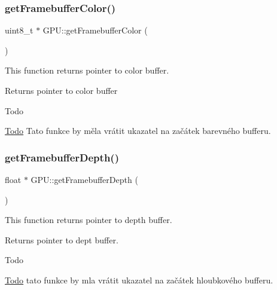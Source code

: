 \subsubsection{\texorpdfstring{get\+Framebuffer\+Color()}{getFramebufferColor()}}
{\footnotesize\ttfamily uint8\+\_\+t $\ast$ G\+P\+U\+::get\+Framebuffer\+Color (\begin{DoxyParamCaption}{ }\end{DoxyParamCaption})}



This function returns pointer to color buffer. 

\begin{DoxyReturn}{Returns}
pointer to color buffer 
\end{DoxyReturn}
\begin{DoxyRefDesc}{Todo}
\item[\hyperlink{todo__todo000031}{Todo}]Tato funkce by měla vrátit ukazatel na začátek barevného bufferu.~\newline
 \end{DoxyRefDesc}
\mbox{\label{group__framebuffer__tasks_gab755d51ff9686df1fb9b2892b9861c1d}} 
\subsubsection{\texorpdfstring{get\+Framebuffer\+Depth()}{getFramebufferDepth()}}
{\footnotesize\ttfamily float $\ast$ G\+P\+U\+::get\+Framebuffer\+Depth (\begin{DoxyParamCaption}{ }\end{DoxyParamCaption})}



This function returns pointer to depth buffer. 

\begin{DoxyReturn}{Returns}
pointer to dept buffer. 
\end{DoxyReturn}
\begin{DoxyRefDesc}{Todo}
\item[\hyperlink{todo__todo000032}{Todo}]tato funkce by mla vrátit ukazatel na začátek hloubkového bufferu.~\newline
 \end{DoxyRefDesc}
\mbox{\label{group__framebuffer__tasks_gaa115f7153407b8020fd153b71abccf0e}} 
